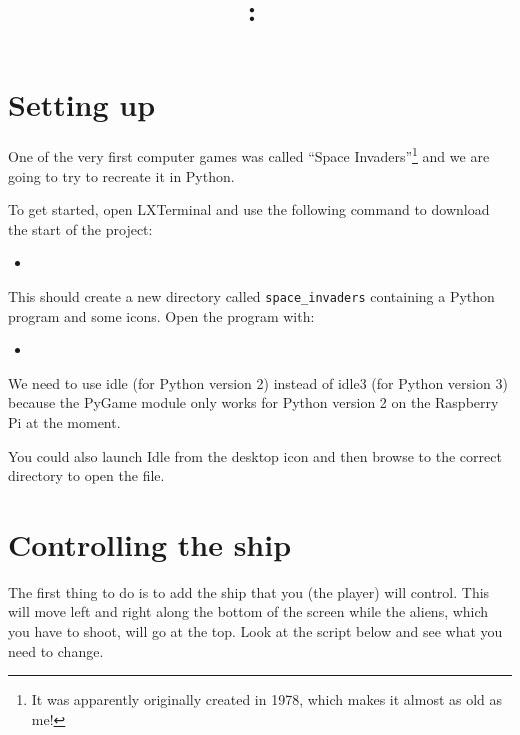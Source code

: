 \documentclass[12pt]{article}
\title{
\vspace{2in}
\textmd{\textbf{\hmwkClass:\ \hmwkTitle}}\\
\vspace{3in}
}
\date{} %
\newcommand{\bashscript}[2]{
\begin{itemize}
\item[]
\end{itemize}
}
\newenvironment{hint}{
  \begin{tcolorbox}[colback=green!5,colframe=green!40!black,title=Note]}
{\end{tcolorbox}}
\begin{document}
\maketitle



\newpage


\section{Setting up}

One of the very first computer games was called ``Space Invaders''\footnote{It
was apparently originally created in 1978, which makes it almost as old as me!}
and we are going to try to recreate it in Python.

To get started, open LXTerminal and use the following command to download the
start of the project:

\bashscript{setup}{Get the the starting point}

This should create a new directory called \texttt{space\_invaders} containing
a Python program and some icons. Open the program with:

\bashscript{openscript}{Opening the starting point}

\begin{hint}
We need to use idle (for Python version 2) instead of idle3 (for Python
version 3) because the PyGame module only works for Python version 2 on the
Raspberry Pi at the moment.

You could also launch Idle from the desktop icon and then browse to the
correct directory to open the file.
\end{hint}

\section{Controlling the ship}

The first thing to do is to add the ship that you (the player) will control.
This will move left and right along the bottom of the screen while the aliens,
which you have to shoot, will go at the top. Look at the script below and see
what you need to change.
\end{document}
